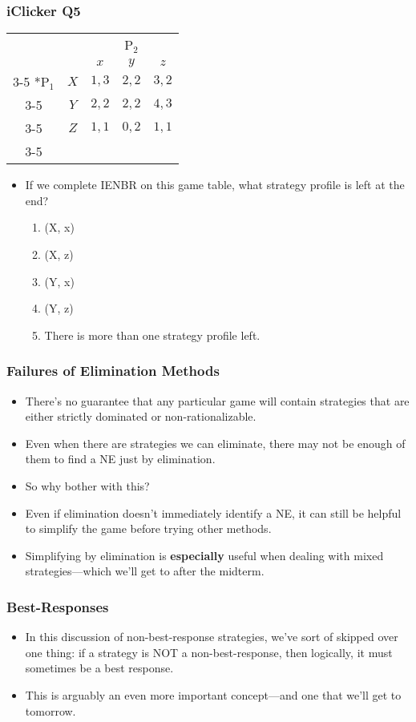\begin{frame}
\frametitle{iClicker Q5}
\begin{table}[h]
	\centering
	\setlength{\extrarowheight}{2pt}
	\begin{tabular}{cc|c|c|c|}
	& \multicolumn{1}{c}{} & \multicolumn{3}{c}{P$_2$}\\
	& \multicolumn{1}{c}{} & \multicolumn{1}{c}{$x$} & \multicolumn{1}{c}{$y$} & \multicolumn{1}{c}{$z$} \\\cline{3-5}
	\multirow{3}*{P$_1$}  & $X$ & $1,3$ & $2,2$ & $3,2$ \\\cline{3-5}
	& $Y$ & $2,2$ & $2,2$ & $4,3$\\\cline{3-5}
	& $Z$ & $1,1$ & $0,2$ & $1,1$\\\cline{3-5}
	\end{tabular}
\end{table}
\begin{itemize}
	\item If we complete IENBR on this game table, what strategy profile is left at the end?
	\begin{enumerate}[label=\Alph*)]
		\item (X, x)
		\item (X, z)
		\item (Y, x)
		\item (Y, z)
		\item There is more than one strategy profile left.
	\end{enumerate}
\end{itemize}
\end{frame}

\begin{frame}
\frametitle{Failures of Elimination Methods}
\begin{itemize}
	\item There's no guarantee that any particular game will contain strategies that are either strictly dominated or non-rationalizable.
	\item Even when there are strategies we can eliminate, there may not be enough of them to find a NE just by elimination.
	\item So why bother with this?
	\item Even if elimination doesn't immediately identify a NE, it can still be helpful to simplify the game before trying other methods.
	\item Simplifying by elimination is \textbf{especially} useful when dealing with mixed strategies---which we'll get to after the midterm.
\end{itemize}
\end{frame}

\begin{frame}
\frametitle{Best-Responses}
\begin{itemize}
	\item In this discussion of non-best-response strategies, we've sort of skipped over one thing: if a strategy is NOT a non-best-response, then logically, it must sometimes be a best response.
	\item This is arguably an even more important concept---and one that we'll get to tomorrow.
\end{itemize}
\end{frame}

